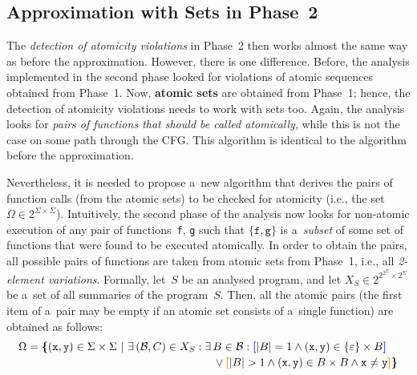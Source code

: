 \subsection{Approximation with Sets in Phase~2}

The \emph{detection of atomicity violations} in Phase~2 then works almost the same way as before the approximation. However, there is one difference. Before, the analysis implemented in the second phase looked for violations of atomic sequences obtained from Phase~1. Now, \textbf{atomic sets} are obtained from Phase~1; hence, the detection of atomicity violations needs to work with sets too. Again, the analysis looks for \emph{pairs of functions that should be called atomically}, while this is not the case on some path through the CFG. This algorithm is identical to the algorithm before the approximation.

Nevertheless, it is needed to propose a~new algorithm that derives the pairs of function calls (from the atomic sets) to be checked for atomicity (i.e., the set~$ \Omega \in 2^{\Sigma \times \Sigma} $). Intuitively, the second phase of the analysis now looks for non-atomic execution of any pair of functions~\texttt{f}, \texttt{g} such that $ \{\mathtt{f}, \mathtt{g}\} $ is a~\emph{subset} of some set of functions that were found to be executed atomically. In order to obtain the pairs, all possible pairs of functions are taken from atomic sets from Phase~1, i.e., all \emph{2-element variations}. Formally, let~$ S $ be an analysed program, and let $ X_S \in 2^{2^{2^\Sigma} \times 2^\Sigma} $ be a~set of all summaries of the program~$ S $. Then, all the atomic pairs (the first item of a~pair may be empty if an atomic set consists of a~single function) are obtained as follows:
$$
\begin{multlined}
    \Omega = \bb{\{}(\mathtt{x}, \mathtt{y}) \in \Sigma \times \Sigma\ |\ \exists\,(\mathcal{B}, C) \in X_S : \exists\,B \in \mathcal{B} : \bA{[}|B| = 1 \wedge (\mathtt{x}, \mathtt{y}) \in \{\varepsilon\} \times B\bA{]} \\
%
    \vee \bB{[}|B| > 1 \wedge (\mathtt{x}, \mathtt{y}) \in B \times B \wedge \mathtt{x} \neq \mathtt{y}%
%
    \bB{]}\bb{\}}
\end{multlined}
$$

